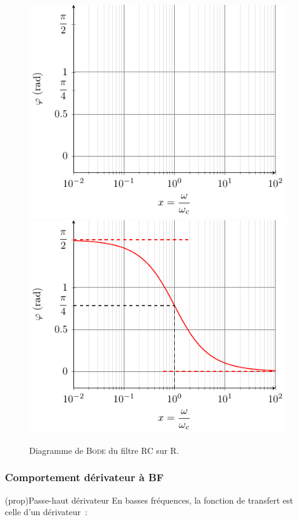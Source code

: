 \documentclass[../../main/main.tex]{subfiles}
\begin{document}
\begin{figure}[htbp!]
{{			\includegraphics[width=.95\linewidth]{RCR_bode-phase_plain}
		}{%
			\includegraphics[width=.95\linewidth]{RCR_bode-phase}
		}%
		\vspace{-15pt}
	}%
	\caption{Diagramme de \textsc{Bode} du filtre RC sur R.}
	\label{fig:rcrbode}
\end{figure}

\subsubsection{Comportement dérivateur à BF}
\begin{tcb*}(prop){Passe-haut dérivateur}
	En basses fréquences, la fonction de transfert est celle d'un dérivateur~:
	\vspace{-15pt}
\end{tcb*}
\end{document}
